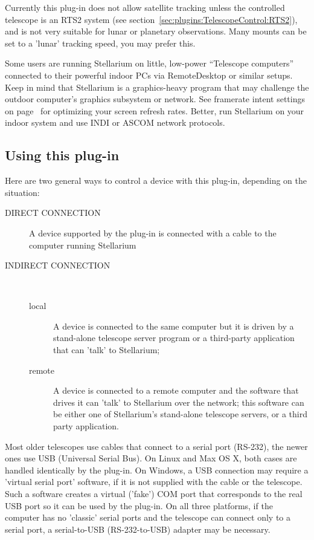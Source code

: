 Currently this plug-in does not allow satellite tracking unless the controlled 
telescope is an RTS2 system (see section~\ref{sec:plugins:TelescopeControl:RTS2}), 
and is not very suitable for lunar or planetary observations. 
Many mounts can be set to a 'lunar' tracking speed, you may prefer this. 

Some users are running Stellarium on little, low-power ``Telescope computers'' connected to 
their powerful indoor PCs via RemoteDesktop or similar setups. Keep in mind that Stellarium 
is a graphics-heavy program that may challenge the outdoor computer's graphics subsystem or network.
See framerate intent settings on page~\pageref{sec:gui:configuration:tools:fps} for optimizing your screen refresh rates. 
Better, run Stellarium on your indoor system and use INDI or ASCOM network protocols.

\subsection{Using this plug-in}
\label{sec:plugins:TelescopeControl:using}

Here are two general ways to control a device with this plug-in, depending on the situation:
\begin{description}
\item[DIRECT CONNECTION] A device supported by the plug-in is
  connected with a cable to the computer running Stellarium

\item[INDIRECT CONNECTION]\mbox{\ } %
  \begin{description}
  \item[local] A device is connected to the same computer but it is
    driven by a stand-alone telescope server program or a third-party
    application that can 'talk' to Stellarium;

  \item[remote] A device is connected to a remote computer and the
    software that drives it can 'talk' to Stellarium over the network;
    this software can be either one of Stellarium's stand-alone
    telescope servers, or a third party application.
  \end{description}
\end{description}
Most older telescopes use cables that connect to a serial port
(RS-232), the newer ones use USB (Universal Serial Bus). On Linux and
Max OS X, both cases are handled identically by the plug-in. On
Windows, a USB connection may require a 'virtual serial port'
software, if it is not supplied with the cable or the telescope. Such
a software creates a virtual ('fake') COM port that corresponds to the
real USB port so it can be used by the plug-in. On all three
platforms, if the computer has no 'classic' serial ports and the
telescope can connect only to a serial port, a serial-to-USB
(RS-232-to-USB) adapter may be necessary.

